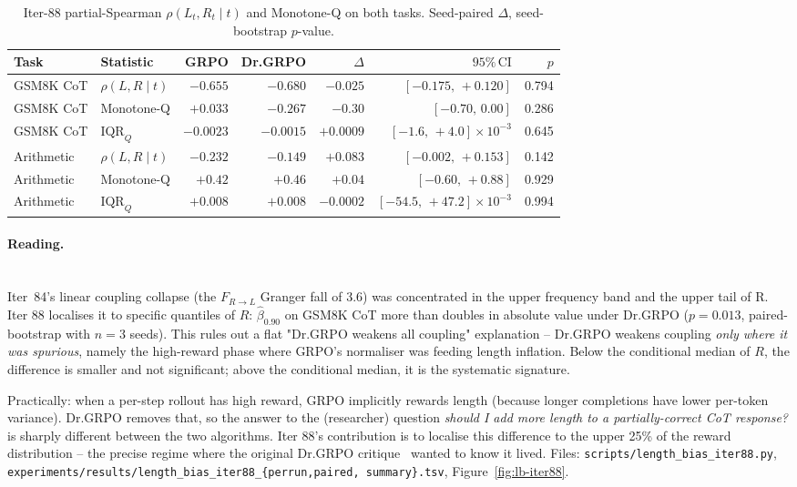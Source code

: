 \begin{table}[t]
\centering\small
\caption{Iter-88 partial-Spearman $\rho(L_t,R_t\mid t)$ and Monotone-Q
on both tasks.  Seed-paired $\Delta$, seed-bootstrap $p$-value.}\label{tab:lb-iter88-partial}
\begin{tabular}{llrrrrr}\hline
Task & Statistic & GRPO & Dr.GRPO & $\Delta$ & $95\%\,\mathrm{CI}$ & $p$\\\hline
GSM8K CoT        & $\rho(L,R\mid t)$   & $-0.655$ & $-0.680$ & $-0.025$ & $[-0.175,\,+0.120]$ & 0.794\\
GSM8K CoT        & Monotone-Q           & $+0.033$ & $-0.267$ & $-0.30$  & $[-0.70,\,0.00]$     & 0.286\\
GSM8K CoT        & $\mathrm{IQR}_Q$     & $-0.0023$ & $-0.0015$ & $+0.0009$ & $[-1.6,\,+4.0]\!\times\!10^{-3}$ & 0.645\\
Arithmetic & $\rho(L,R\mid t)$   & $-0.232$ & $-0.149$ & $+0.083$ & $[-0.002,\,+0.153]$  & 0.142\\
Arithmetic & Monotone-Q           & $+0.42$  & $+0.46$  & $+0.04$  & $[-0.60,\,+0.88]$    & 0.929\\
Arithmetic & $\mathrm{IQR}_Q$     & $+0.008$ & $+0.008$ & $-0.0002$ & $[-54.5,\,+47.2]\!\times\!10^{-3}$ & 0.994\\\hline
\end{tabular}
\end{table}

\paragraph{Reading.}\leavevmode\\[-0.3em]
Iter~84's linear coupling collapse (the $F_{R\to L}$ Granger fall of
3.6) was concentrated in the upper frequency band and the upper tail
of R.  Iter 88 localises it to specific quantiles of $R$: $\hat\beta_{0.90}$
on GSM8K CoT more than doubles in absolute value under Dr.GRPO
($p\!=\!0.013$, paired-bootstrap with $n\!=\!3$ seeds).  This rules out a
flat "Dr.GRPO weakens all coupling" explanation -- Dr.GRPO weakens
coupling \emph{only where it was spurious}, namely the high-reward
phase where GRPO's normaliser was feeding length inflation.  Below the
conditional median of $R$, the difference is smaller and not
significant; above the conditional median, it is the systematic
signature.

Practically: when a per-step rollout has high reward, GRPO implicitly
rewards length (because longer completions have lower per-token
variance).  Dr.GRPO removes that, so the answer to the (researcher)
question \emph{should I add more length to a partially-correct
CoT response?} is sharply different between the two algorithms.  Iter 88's
contribution is to localise this difference to the upper 25\% of the
reward distribution -- the precise regime where the original
Dr.GRPO critique~\citep{liu2025drgrpo} wanted to know it lived.
Files: \texttt{scripts/length\_bias\_iter88.py},
\texttt{experiments/results/length\_bias\_iter88\_\{perrun,paired,
summary\}.tsv},
Figure~\ref{fig:lb-iter88}.

